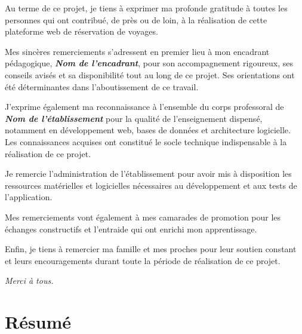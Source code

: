 \documentclass[12pt,a4paper]{report}
\begin{document}
\vspace{1cm}

Au terme de ce projet, je tiens à exprimer ma profonde gratitude à toutes les personnes qui ont contribué, de près ou de loin, à la réalisation de cette plateforme web de réservation de voyages.

\vspace{0.5cm}

Mes sincères remerciements s'adressent en premier lieu à mon encadrant pédagogique, \textbf{\textit{Nom de l'encadrant}}, pour son accompagnement rigoureux, ses conseils avisés et sa disponibilité tout au long de ce projet. Ses orientations ont été déterminantes dans l'aboutissement de ce travail.

\vspace{0.5cm}

J'exprime également ma reconnaissance à l'ensemble du corps professoral de \textbf{\textit{Nom de l'établissement}} pour la qualité de l'enseignement dispensé, notamment en développement web, bases de données et architecture logicielle. Les connaissances acquises ont constitué le socle technique indispensable à la réalisation de ce projet.

\vspace{0.5cm}

Je remercie l'administration de l'établissement pour avoir mis à disposition les ressources matérielles et logicielles nécessaires au développement et aux tests de l'application.

\vspace{0.5cm}

Mes remerciements vont également à mes camarades de promotion pour les échanges constructifs et l'entraide qui ont enrichi mon apprentissage.

\vspace{0.5cm}

Enfin, je tiens à remercier ma famille et mes proches pour leur soutien constant et leurs encouragements durant toute la période de réalisation de ce projet.

\vspace{1cm}

\hfill \textit{Merci à tous.}

\clearpage

\chapter*{Résumé}
\end{document}
